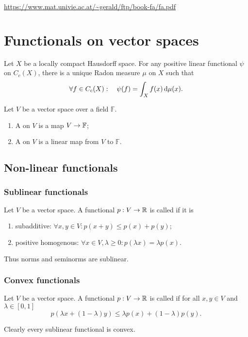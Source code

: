 
\url{https://www.mat.univie.ac.at/~gerald/ftp/book-fa/fa.pdf}


\chapter{Functionals on vector spaces}

\begin{theorem}
Let $X$ be a locally compact Hausdorff space. For any positive linear functional $\psi$ on $C_c(X)$, there is a unique Radon measure $\mu$ on $X$ such that
\[ \forall f\in C_c(X): \quad \psi(f) = \int_X f(x)\operatorname{d \!}{\mu(x)}. \]
\end{theorem}

\begin{definition}
Let $V$ be a vector space over a field $\mathbb{F}$.
\begin{enumerate}
\item A  on $V$ is a map $V\to \mathbb{F}$;
\item A  on $V$ is a linear map from $V$ to $\mathbb{F}$.
\end{enumerate}
\end{definition}

\section{Non-linear functionals}
\subsection{Sublinear functionals}
\begin{definition}
Let $V$ be a vector space. A functional $p:V\to \mathbb{R}$ is called  if it is
\begin{enumerate}
\item subadditive: $\forall x,y\in V: p(x+y) \leq p(x) + p(y)$;
\item positive homogenous: $\forall x\in V,\lambda\geq 0: p(\lambda x) = \lambda p(x)$.
\end{enumerate}
\end{definition}
Thus norms and seminorms are sublinear.

\subsection{Convex functionals}
\begin{definition}
Let $V$ be a vector space. A functional $p:V\to \mathbb{R}$ is called  if for all $x,y\in V$ and $\lambda\in [0,1]$
\[ p(\lambda x + (1-\lambda)y) \leq \lambda p(x) + (1-\lambda)p(y). \]
\end{definition}
Clearly every sublinear functional is convex.


